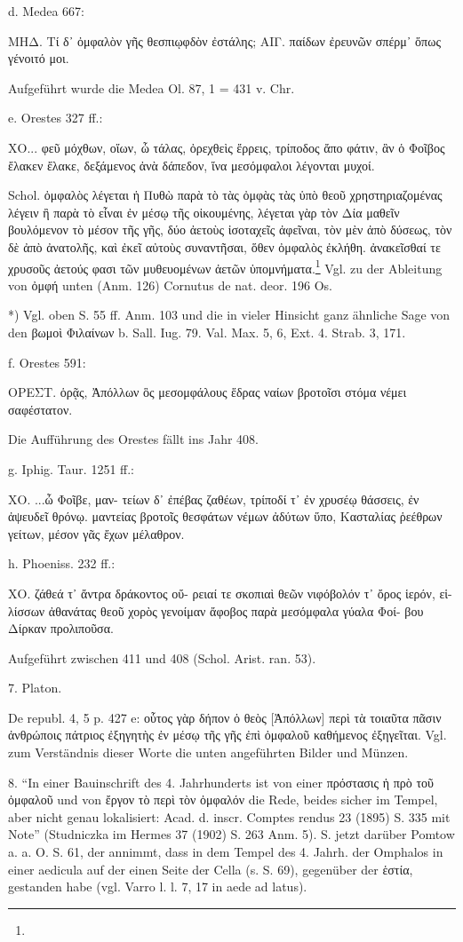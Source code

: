 \documentclass[a4paper, 11pt, oneside]{article}
\begin{document}
d. Medea 667:

ΜΗΔ. Τί δ᾽ ὀμφαλὸν γῆς θεσπιῳφδὸν ἐστάλης;  
ΑΙΓ. παίδων ἐρευνῶν σπέρμ᾽ ὅπως γένοιτό μοι.

Aufgeführt wurde die Medea Ol. 87, 1 = 431 v. Chr.

e. Orestes 327 ff.:

ΧΟ...  
φεῦ μόχθων,  
οἵων, ὦ τάλας, ὀρεχθεὶς ἔρρεις,  
τρίποδος ἄπο φάτιν, ἃν ὁ Φοῖβος  
ἔλακεν ἔλακε, δεξάμενος ἀνὰ δάπεδον,  
ἵνα μεσόμφαλοι λέγονται μυχοί.

Schol. ὀμφαλὸς λέγεται ἡ Πυθὼ παρὰ τὸ τὰς ὀμφὰς τὰς ὑπὸ θεοῦ χρηστηριαζομένας λέγειν ἢ παρὰ τὸ εἶναι ἐν μέσῳ τῆς οἰκουμένης, λέγεται γὰρ τὸν Δία μαθεῖν βουλόμενον τὸ μέσον τῆς γῆς, δύο ἀετοὺς ἰσοταχεῖς ἀφεῖναι, τὸν μὲν ἀπὸ δύσεως, τὸν δὲ ἀπὸ ἀνατολῆς, καὶ ἐκεῖ αὐτοὺς συναντῆσαι, ὅθεν ὀμφαλὸς ἐκλήθη. ἀνακεῖσθαί τε χρυσοῦς ἀετούς φασι τῶν μυθευομένων ἀετῶν ὑπομνήματα.\footnote{} Vgl. zu der Ableitung von ὀμφή unten (Anm. 126) Cornutus de nat. deor. 196 Os.

*) Vgl. oben S. 55 ff. Anm. 103 und die in vieler Hinsicht ganz ähnliche Sage von den βωμοὶ Φιλαίνων b. Sall. Iug. 79. Val. Max. 5, 6, Ext. 4. Strab. 3, 171.

f. Orestes 591:

ΟΡΕΣΤ.  
ὁρᾷς, Ἀπόλλων ὃς μεσομφάλους ἕδρας  
ναίων βροτοῖσι στόμα νέμει σαφέστατον.

Die Aufführung des Orestes fällt ins Jahr 408.

g. Iphig. Taur. 1251 ff.:

ΧΟ.  
...ὦ Φοῖβε, μαν-  
τείων δ᾽ ἐπέβας ζαθέων,  
τρίποδί τ᾽ ἐν χρυσέῳ  
θάσσεις, ἐν ἀψευδεῖ θρόνῳ.  
μαντείας βροτοῖς  
θεσφάτων νέμων  
ἀδύτων ὕπο, Κασταλίας ῥεέθρων  
γείτων, μέσον γᾶς ἔχων μέλαθρον.

h. Phoeniss. 232 ff.:

ΧΟ.  
ζάθεά τ᾽ ἄντρα δράκοντος οὔ-  
ρειαί τε σκοπιαὶ θεῶν  
νιφόβολόν τ᾽ ὄρος ἱερόν, εἱ-  
λίσσων ἀθανάτας θεοῦ  
χορὸς γενοίμαν ἄφοβος  
παρὰ μεσόμφαλα γύαλα Φοί-  
βου Δίρκαν προλιποῦσα.

Aufgeführt zwischen 411 und 408 (Schol. Arist. ran. 53).

7. Platon.

De republ. 4, 5 p. 427 e: οὗτος γὰρ δήπον ὁ θεὸς [Ἀπόλλων] περὶ τὰ τοιαῦτα πᾶσιν ἀνθρώποις πάτριος ἐξηγητὴς ἐν μέσῳ τῆς γῆς ἐπὶ ὀμφαλοῦ καθήμενος ἐξηγεῖται. Vgl. zum Verständnis dieser Worte die unten angeführten Bilder und Münzen.

8. "`In einer Bauinschrift des 4. Jahrhunderts ist von einer πρόστασις ἡ πρὸ τοῦ ὀμφαλοῦ und von ἔργον τὸ περὶ τὸν ὀμφαλόν die Rede, beides sicher im Tempel, aber nicht genau lokalisiert: Acad. d. inscr. Comptes rendus 23 (1895) S. 335 mit Note"' (Studniczka im Hermes 37 (1902) S. 263 Anm. 5). S. jetzt darüber Pomtow a. a. O. S. 61, der annimmt, dass in dem Tempel des 4. Jahrh. der Omphalos in einer aedicula auf der einen Seite der Cella (s. S. 69), gegenüber der ἑστία, gestanden habe (vgl. Varro l. l. 7, 17 in aede ad latus).
\end{document}
